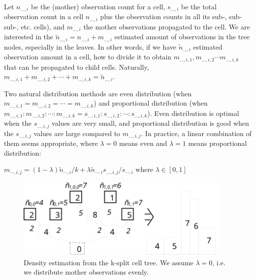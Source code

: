 
Let $n_{...,i}$ be the (mother) observation count for a cell,
$s_{...,i}$ be the total observation count in a cell $n_{...,i}$ plus
the observation counts in all its sub-, sub-sub-, etc. cells), and
$m_{...,i}$ the mother observations propagated to the cell. We are
interested in the $\tilde{n}_{...,i} = n_{...,i} + m_{...,i}$
estimated amount of observations in the tree nodes, especially in the
leaves. In other words, if we have $\tilde{n}_{...,i}$ estimated
observation amount in a cell, how to divide it to obtain
$m_{...,i,1}, m_{...,i,2} \cdots m_{...,i,k}$
that can be propagated to child cells. Naturally,
$m_{...,i,1} + m_{...,i,2} + \cdots + m_{...,i,k} = \tilde{n}_{...,i}$.


Two natural distribution methods are even
distribution (when
$m_{...,i,1} = m_{...,i,2} = \cdots = m_{...,i,k}$) and proportional
distribution (when
$m_{...,i,1} : m_{...,i,2} : \cdots : m_{...,i,k} = s_{...,i,1} : s_{...,i,2} : \cdots : s_{...,i,k}$).
Even distribution is optimal when the
$s_{...,i,j}$ values are very small, and proportional distribution is
good when the $s_{...,i,j}$ values are large compared to
$m_{...,i,j}$. In practice, a linear combination of them seems
appropriate, where $\lambda=0$ means even and $\lambda=1$ means
proportional distribution:


$m_{\cdots,i,j} = (1-\lambda)\tilde{n}_{\cdots,i}/k + \lambda \tilde{n}_{\cdots,i} s_{...,i,j} / s_{\cdots,i}$
where $\lambda\in[0,1]$

\begin{figure}[htbp]
  \begin{center}
    \includegraphics[width=4.147in, height=1.567in]{figures/simlib-ksplit2}
    \caption{Density estimation from the k-split cell tree. We
      assume $\lambda=0$, i.e. we distribute mother observations
      evenly.}
  \end{center}
\end{figure}

